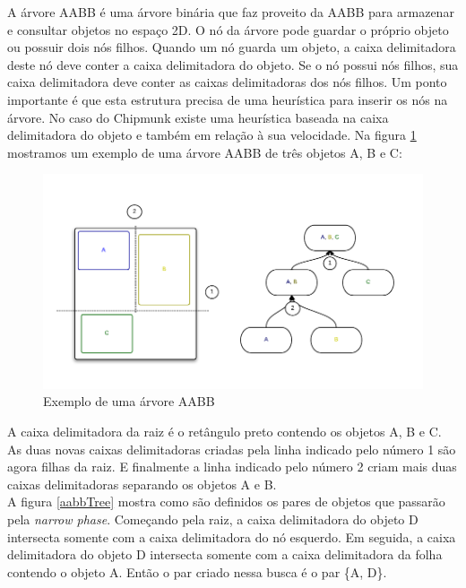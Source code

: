 A árvore AABB é uma árvore binária que faz proveito da AABB para armazenar e consultar objetos no espaço 2D. O nó da árvore pode guardar o próprio objeto 
ou possuir dois nós filhos. Quando um nó guarda um objeto, a caixa delimitadora deste nó deve conter a caixa delimitadora do objeto. Se o nó possui nós filhos, 
sua caixa delimitadora deve conter as caixas delimitadoras dos nós filhos. 
Um ponto importante é que esta estrutura precisa de uma heurística para inserir os nós na árvore. No caso do Chipmunk existe uma heurística baseada na caixa 
delimitadora do objeto e também em relação à sua velocidade. Na figura \ref{aabb} mostramos um exemplo de uma árvore AABB de três objetos A, B e C: 

\begin{figure}[!htbp]
  \includegraphics[scale=0.4]{AABBTree.png}
  \caption{Exemplo de uma árvore AABB}
  \label{aabb}
\end{figure}

A caixa delimitadora da raiz é o retângulo preto contendo os objetos A, B e C.
As duas novas caixas delimitadoras criadas pela linha indicado pelo número 1 são agora filhas da raiz. 
E finalmente a linha indicado pelo número 2 criam mais duas caixas delimitadoras separando os objetos A e B.\\

A figura \ref{aabbTree} mostra como são definidos os pares de objetos que passarão pela \textit{narrow phase}. Começando pela raiz, a caixa delimitadora do objeto D intersecta somente 
com a caixa delimitadora do nó esquerdo. Em seguida, a caixa delimitadora do objeto D intersecta somente com a caixa delimitadora da folha contendo o objeto A.
Então o par criado nessa busca é o par \{A, D\}.

